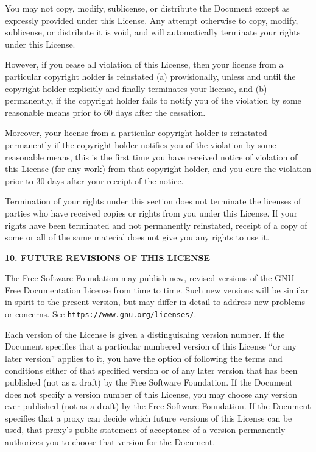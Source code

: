 You may not copy, modify, sublicense, or distribute the Document except as
expressly provided under this License. Any attempt otherwise to copy, modify,
sublicense, or distribute it is void, and will automatically terminate your
rights under this License.

However, if you cease all violation of this License, then your license from a
particular copyright holder is reinstated (a) provisionally, unless and until
the copyright holder explicitly and finally terminates your license, and (b)
permanently, if the copyright holder fails to notify you of the violation by
some reasonable means prior to 60 days after the cessation.

Moreover, your license from a particular copyright holder is reinstated
permanently if the copyright holder notifies you of the violation by some
reasonable means, this is the first time you have received notice of violation
of this License (for any work) from that copyright holder, and you cure the
violation prior to 30 days after your receipt of the notice.

Termination of your rights under this section does not terminate the licenses of
parties who have received copies or rights from you under this License. If your
rights have been terminated and not permanently reinstated, receipt of a copy of
some or all of the same material does not give you any rights to use it.


\begin{center}
  {\Large\bf 10. FUTURE REVISIONS OF THIS LICENSE\par}
\end{center}


The Free Software Foundation may publish new, revised versions of the GNU Free
Documentation License from time to time. Such new versions will be similar in
spirit to the present version, but may differ in detail to address new problems
or concerns. See \texttt{https://www.gnu.org/licenses/}.

Each version of the License is given a distinguishing version number. If the
Document specifies that a particular numbered version of this License ``or any
later version'' applies to it, you have the option of following the terms and
conditions either of that specified version or of any later version that has
been published (not as a draft) by the Free Software Foundation. If the Document
does not specify a version number of this License, you may choose any version
ever published (not as a draft) by the Free Software Foundation. If the Document
specifies that a proxy can decide which future versions of this License can be
used, that proxy's public statement of acceptance of a version permanently
authorizes you to choose that version for the Document.


